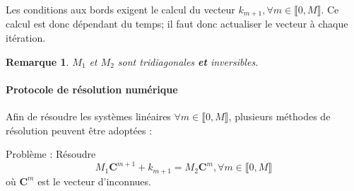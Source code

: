 \documentclass[11pt,a4paper]{article}
\newcommand*{\intval}[2]{\llbracket #1, #2 \rrbracket}
\newcommand*{\C}[2]{\mathbf{C}^{#1}_{#2}}
\theoremstyle{plain}
\newtheorem{rmq}{Remarque}
\begin{document}
Les conditions aux bords exigent le calcul du vecteur $k_{m + 1}, \forall m \in \intval{0}{M}$. Ce calcul est donc dépendant du temps; il faut donc actualiser le vecteur à chaque itération.

\begin{rmq}$M_1$ et $M_2$ sont tridiagonales \textbf{et} inversibles.
\end{rmq}

\paragraph{Protocole de résolution numérique} Afin de résoudre les systèmes linéaires $\forall m \in \intval{0}{M}$, plusieurs méthodes de résolution peuvent être adoptées :

Problème : Résoudre $${M_1\C{m + 1}{} + k_{m + 1} = M_2\C{m}{}}, \forall m \in \intval{0}{M}$$
où $\C{m}{}$ est le vecteur d'inconnues.
\end{document}
